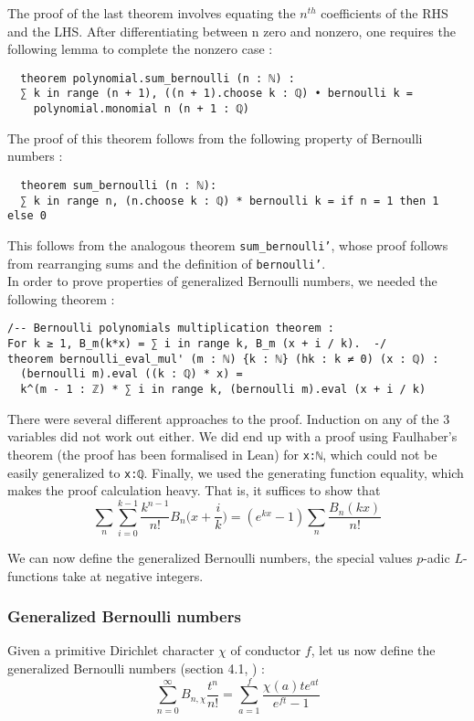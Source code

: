 \documentclass[a4paper,UKenglish,cleveref, autoref, thm-restate]{lipics-v2021}
\newcommand{\lean}[1]{\texttt{#1}\xspace} %
\begin{document}
The proof of the last theorem involves equating the $n^{th}$ coefficients of the RHS and the LHS.
After differentiating between n zero and nonzero, one requires the following lemma to complete the
nonzero case :
\begin{lstlisting}
  theorem polynomial.sum_bernoulli (n : ℕ) :
  ∑ k in range (n + 1), ((n + 1).choose k : ℚ) • bernoulli k =
    polynomial.monomial n (n + 1 : ℚ)
\end{lstlisting}

The proof of this theorem follows from the following property of Bernoulli numbers :

\begin{lstlisting}
  theorem sum_bernoulli (n : ℕ):
  ∑ k in range n, (n.choose k : ℚ) * bernoulli k = if n = 1 then 1 else 0
\end{lstlisting}

This follows from the analogous theorem \lean{sum\_bernoulli'}, whose proof follows from rearranging
sums and the definition of \lean{bernoulli'}. \\

In order to prove properties of generalized Bernoulli numbers, we needed the following theorem :
\begin{lstlisting}
/-- Bernoulli polynomials multiplication theorem :
For k ≥ 1, B_m(k*x) = ∑ i in range k, B_m (x + i / k).  -/
theorem bernoulli_eval_mul' (m : ℕ) {k : ℕ} (hk : k ≠ 0) (x : ℚ) :
  (bernoulli m).eval ((k : ℚ) * x) = 
  k^(m - 1 : ℤ) * ∑ i in range k, (bernoulli m).eval (x + i / k) 
\end{lstlisting}

There were several different approaches to the proof. Induction on any of the 3 variables did not work 
out either. We did end up with a proof using Faulhaber's theorem (the proof has been formalised in Lean) 
for \lean{x:ℕ}, which could not be easily generalized to \lean{x:ℚ}. Finally, we used the generating function 
equality, which makes the proof calculation heavy. That is, it suffices to show that 
$$ \sum_n \sum_{i = 0}^{k - 1} \frac{k^{n - 1}}{n!} B_n \bigg(x + \frac{i}{k} \bigg) = (e^{kx} - 1) \sum_n \frac{B_n (kx)}{n!} $$

We can now define the generalized Bernoulli numbers, the special values $p$-adic $L$-functions take at negative integers.

\subsubsection{Generalized Bernoulli numbers}
Given a primitive Dirichlet character $\chi$ of conductor $f$, let us now define the generalized
Bernoulli numbers (section 4.1, \cite{cyc}) :
$$ \sum_{n = 0}^{\infty} B_{n,\chi} \frac{t^n}{n!} = \sum_{a = 1}^f \frac{\chi(a)t e^{at}}{e^{ft} - 1} $$
\end{document}
